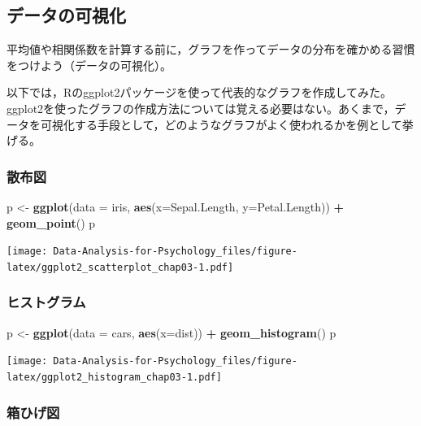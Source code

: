 \documentclass[]{article}
\newenvironment{Shaded}{\begin{snugshade}}{\end{snugshade}}
\newcommand{\KeywordTok}[1]{\textcolor[rgb]{0.13,0.29,0.53}{\textbf{#1}}}
\newcommand{\DataTypeTok}[1]{\textcolor[rgb]{0.13,0.29,0.53}{#1}}
\newcommand{\StringTok}[1]{\textcolor[rgb]{0.31,0.60,0.02}{#1}}
\newcommand{\OperatorTok}[1]{\textcolor[rgb]{0.81,0.36,0.00}{\textbf{#1}}}
\newcommand{\NormalTok}[1]{#1}
\begin{document}
\subsection{データの可視化}\label{-1}

平均値や相関係数を計算する前に，グラフを作ってデータの分布を確かめる習慣をつけよう（データの可視化）。

以下では，Rのggplot2パッケージを使って代表的なグラフを作成してみた。ggplot2を使ったグラフの作成方法については覚える必要はない。あくまで，データを可視化する手段として，どのようなグラフがよく使われるかを例として挙げる。

\subsubsection{散布図}

\begin{Shaded}
\begin{Highlighting}[]
\NormalTok{p <-}\StringTok{ }\KeywordTok{ggplot}\NormalTok{(}\DataTypeTok{data =}\NormalTok{ iris, }\KeywordTok{aes}\NormalTok{(}\DataTypeTok{x=}\NormalTok{Sepal.Length, }\DataTypeTok{y=}\NormalTok{Petal.Length)) }\OperatorTok{+}\StringTok{ }
\StringTok{      }\KeywordTok{geom_point}\NormalTok{()}
\NormalTok{p}
\end{Highlighting}
\end{Shaded}

\texttt{[image: Data-Analysis-for-Psychology\_files/figure-latex/ggplot2\_scatterplot\_chap03-1.pdf]}

\subsubsection{ヒストグラム}

\begin{Shaded}
\begin{Highlighting}[]
\NormalTok{p <-}\StringTok{ }\KeywordTok{ggplot}\NormalTok{(}\DataTypeTok{data =}\NormalTok{ cars, }\KeywordTok{aes}\NormalTok{(}\DataTypeTok{x=}\NormalTok{dist)) }\OperatorTok{+}\StringTok{ }
\StringTok{      }\KeywordTok{geom_histogram}\NormalTok{()}
\NormalTok{p}
\end{Highlighting}
\end{Shaded}

\texttt{[image: Data-Analysis-for-Psychology\_files/figure-latex/ggplot2\_histogram\_chap03-1.pdf]}

\subsubsection{箱ひげ図}
\end{document}
